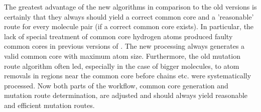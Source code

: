 The greatest advantage of the new algorithms in comparison to the old versions is certainly that they always should yield a correct common core and a 'reasonable' route for every molecule pair (if a correct common core exists). In particular, the lack of special treatment of common core hydrogen atoms produced faulty common cores in previous versions of {\trafo}. The new processing always generates a valid common core with maximum atom size. Furthermore, the old mutation route algorithm often led, especially in the case of bigger molecules, to atom removals in regions near the common core before chains etc. were systematically processed. Now both parts of the workflow, common core generation and mutation route determination, are adjusted and should always yield reasonable and efficient mutation routes.
